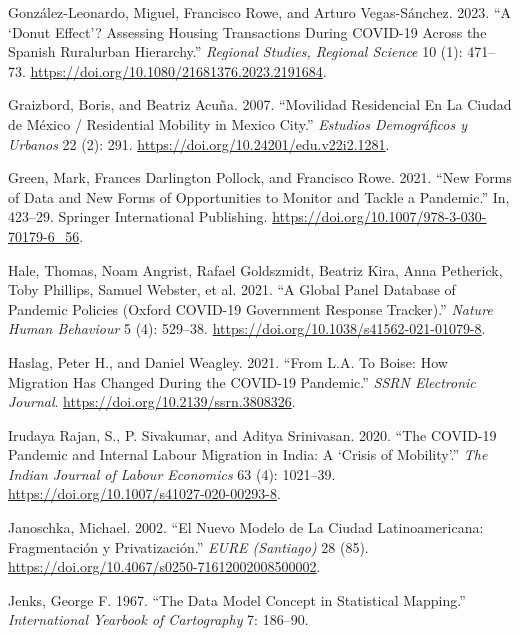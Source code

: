 \documentclass[
  11pt,
]{article}
\newlength{\cslhangindent}
\newlength{\cslentryspacingunit} %
\newenvironment{CSLReferences}[2] %
 {%
  \setlength{\parindent}{0pt}
  \ifodd #1
  \let\oldpar\par
  \def\par{\hangindent=\cslhangindent\oldpar}
  \fi
  \setlength{\parskip}{#2\cslentryspacingunit}
 }%
 {}
\begin{document}
\begin{CSLReferences}{1}{0}
\leavevmode{}%
González-Leonardo, Miguel, Francisco Rowe, and Arturo Vegas-Sánchez.
2023. {``A {`}Donut Effect{'}? Assessing Housing Transactions During
COVID-19 Across the Spanish Rural{\textendash}urban Hierarchy.''}
\emph{Regional Studies, Regional Science} 10 (1): 471--73.
\url{https://doi.org/10.1080/21681376.2023.2191684}.

\leavevmode{}%
Graizbord, Boris, and Beatriz Acuña. 2007. {``Movilidad Residencial En
La Ciudad de México / Residential Mobility in Mexico City.''}
\emph{Estudios Demográficos y Urbanos} 22 (2): 291.
\url{https://doi.org/10.24201/edu.v22i2.1281}.

\leavevmode{}%
Green, Mark, Frances Darlington Pollock, and Francisco Rowe. 2021.
{``New Forms of Data and New Forms of Opportunities to Monitor and
Tackle a Pandemic.''} In, 423--29. Springer International Publishing.
\url{https://doi.org/10.1007/978-3-030-70179-6_56}.

\leavevmode{}%
Hale, Thomas, Noam Angrist, Rafael Goldszmidt, Beatriz Kira, Anna
Petherick, Toby Phillips, Samuel Webster, et al. 2021. {``A Global Panel
Database of Pandemic Policies (Oxford COVID-19 Government Response
Tracker).''} \emph{Nature Human Behaviour} 5 (4): 529--38.
\url{https://doi.org/10.1038/s41562-021-01079-8}.

\leavevmode{}%
Haslag, Peter H., and Daniel Weagley. 2021. {``From L.A. To Boise: How
Migration Has Changed During the COVID-19 Pandemic.''} \emph{SSRN
Electronic Journal}. \url{https://doi.org/10.2139/ssrn.3808326}.

\leavevmode{}%
Irudaya Rajan, S., P. Sivakumar, and Aditya Srinivasan. 2020. {``The
COVID-19 Pandemic and Internal Labour Migration in India: A {`}Crisis of
Mobility{'}.''} \emph{The Indian Journal of Labour Economics} 63 (4):
1021--39. \url{https://doi.org/10.1007/s41027-020-00293-8}.

\leavevmode{}%
Janoschka, Michael. 2002. {``El Nuevo Modelo de La Ciudad
Latinoamericana: Fragmentación y Privatización.''} \emph{EURE
(Santiago)} 28 (85).
\url{https://doi.org/10.4067/s0250-71612002008500002}.

\leavevmode{}%
Jenks, George F. 1967. {``The Data Model Concept in Statistical
Mapping.''} \emph{International Yearbook of Cartography} 7: 186--90.


\end{CSLReferences}
\end{document}
